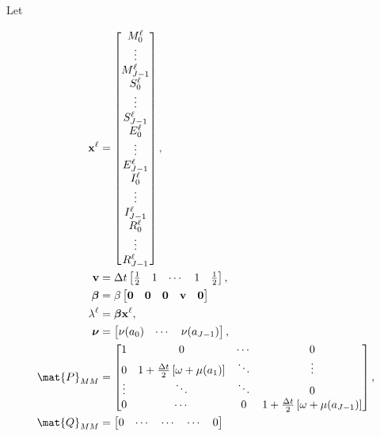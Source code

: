 \documentclass{jpmarticle}
\renewcommand{\vec}[1]{\boldsymbol{\mathrm{#1}}}
\let\subequationsorig\subequations%
\let\endsubequationsorig\endsubequations%
\renewenvironment{subequations}{
  \subequationsorig
  \renewcommand{\theequation}{\theparentequation.\arabic{equation}}
}{
  \endsubequationsorig
}
\begin{document}
Let
\begin{subequations}
  \begin{align}
    \vec{x}^{\ell} &=
    \begin{bmatrix}
      M_0^{\ell} \\ \vdots \\ M_{J - 1}^{\ell} \\
      S_0^{\ell} \\ \vdots \\ S_{J - 1}^{\ell} \\
      E_0^{\ell} \\ \vdots \\ E_{J - 1}^{\ell} \\
      I_0^{\ell} \\ \vdots \\ I_{J - 1}^{\ell} \\
      R_0^{\ell} \\ \vdots \\ R_{J - 1}^{\ell}
    \end{bmatrix},
    \\
    \vec{v} &=
    \Delta t
    \begin{bmatrix}
      \frac{1}{2} & 1 & \cdots & 1 & \frac{1}{2}
    \end{bmatrix},
    \\
    \vec{\beta} &=
    \beta
    \begin{bmatrix}
      \vec{0} & \vec{0} & \vec{0} & \vec{v} & \vec{0}
    \end{bmatrix}
    \\
    \lambda^{\ell} &=
    \vec{\beta} \vec{x}^{\ell},
    \\
    \vec{\nu} &=
    \begin{bmatrix}
      \nu(a_0) & \cdots & \nu(a_{J - 1})
    \end{bmatrix},
    \\
    \mat{P}_{MM} &=
    \begin{bmatrix}
      1 & 0 & \cdots & 0
      \\
      0 & 1 + \frac{\Delta t}{2} \left[\omega + \mu(a_1)\right] &
      \ddots & \vdots
      \\
      \vdots & \ddots & \ddots & 0
      \\
      0 & \cdots & 0 &
      1 + \frac{\Delta t}{2} \left[\omega + \mu(a_{J - 1})\right]
    \end{bmatrix},
    \\
    \mat{Q}_{MM} &=
    \begin{bmatrix}
      0 & \cdots & \cdots & \cdots & 0

\end{bmatrix}
\end{align}
\end{subequations}
\end{document}
